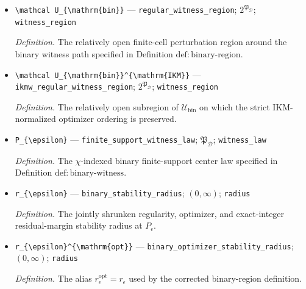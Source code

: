 \documentclass{article}
\begin{document}
\begin{itemize}
  \item \texttt{\textbackslash{}\allowbreak{}mathcal U\_\allowbreak{}\{\textbackslash{}\allowbreak{}mathrm\{bin\}\allowbreak{}\}\allowbreak{}} --- \texttt{regular\_\allowbreak{}witness\_\allowbreak{}region}; \(2^{\mathfrak P_{\mathcal D}}\); \texttt{witness\_\allowbreak{}region}
  \par\smallskip\noindent\emph{Definition.} The relatively open finite-cell perturbation region around the binary witness path specified in Definition \(\mathrm{def{:}binary\text{-}region}\).
  \item \texttt{\textbackslash{}\allowbreak{}mathcal U\_\allowbreak{}\{\textbackslash{}\allowbreak{}mathrm\{bin\}\allowbreak{}\}\allowbreak{}\textasciicircum{}\{\textbackslash{}\allowbreak{}mathrm\{IKM\}\allowbreak{}\}\allowbreak{}} --- \texttt{ikmw\_\allowbreak{}regular\_\allowbreak{}witness\_\allowbreak{}region}; \(2^{\mathfrak P_{\mathcal D}}\); \texttt{witness\_\allowbreak{}region}
  \par\smallskip\noindent\emph{Definition.} The relatively open subregion of \(\mathcal U_{\mathrm{bin}}\) on which the strict IKM-normalized optimizer ordering is preserved.
  \item \texttt{P\_\allowbreak{}\{\textbackslash{}\allowbreak{}epsilon\}\allowbreak{}} --- \texttt{finite\_\allowbreak{}support\_\allowbreak{}witness\_\allowbreak{}law}; \(\mathfrak P_{\mathcal D}\); \texttt{witness\_\allowbreak{}law}
  \par\smallskip\noindent\emph{Definition.} The \(\chi\)-indexed binary finite-support center law specified in Definition \(\mathrm{def{:}binary\text{-}witness}\).
  \item \texttt{r\_\allowbreak{}\{\textbackslash{}\allowbreak{}epsilon\}\allowbreak{}} --- \texttt{binary\_\allowbreak{}stability\_\allowbreak{}radius}; \((0,\infty)\); \texttt{radius}
  \par\smallskip\noindent\emph{Definition.} The jointly shrunken regularity, optimizer, and exact-integer residual-margin stability radius at \(P_\epsilon\).
  \item \texttt{r\_\allowbreak{}\{\textbackslash{}\allowbreak{}epsilon\}\allowbreak{}\textasciicircum{}\{\textbackslash{}\allowbreak{}mathrm\{opt\}\allowbreak{}\}\allowbreak{}} --- \texttt{binary\_\allowbreak{}optimizer\_\allowbreak{}stability\_\allowbreak{}radius}; \((0,\infty)\); \texttt{radius}
  \par\smallskip\noindent\emph{Definition.} The alias \(r_{\epsilon}^{\mathrm{opt}}=r_{\epsilon}\) used by the corrected binary-region definition.

\end{itemize}
\end{document}
